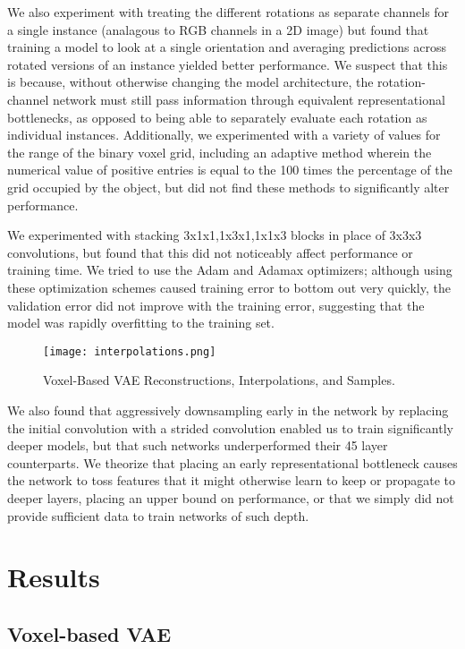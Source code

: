 \documentclass{article}
\begin{document}
We also experiment with treating the different rotations as separate channels for a single instance (analagous to RGB channels in a 2D image) but found that training a model to look at a single orientation and averaging predictions across rotated versions of an instance yielded better performance. We suspect that this is because, without otherwise changing the model architecture, the rotation-channel network must still pass information through equivalent representational bottlenecks, as opposed to being able to separately evaluate each rotation as individual instances. Additionally, we experimented with a variety of values for the range of the binary voxel grid, including an adaptive method wherein the numerical value of positive entries is equal to the 100 times the percentage of the grid occupied by the object, but did not find these methods to significantly alter performance.

We experimented with stacking 3x1x1,1x3x1,1x1x3 blocks in place of 3x3x3 convolutions, but found that this did not noticeably affect performance or training time. We tried to use the Adam and Adamax\citep{Adam} optimizers; although using these optimization schemes caused training error to bottom out very quickly, the validation error did not improve with the training error, suggesting that the model was rapidly overfitting to the training set.
 
\begin{figure}[h]
  	
  \centering
  \texttt{[image: interpolations.png]}
  \caption{Voxel-Based VAE Reconstructions, Interpolations, and Samples.}
  \label{VAERECONfig}
\end{figure}

We also found that aggressively downsampling early in the network by replacing the initial convolution with a strided convolution enabled us to train significantly deeper models, but that such networks underperformed their 45 layer counterparts. We theorize that placing an early representational bottleneck causes the network to toss features that it might otherwise learn to keep or propagate to deeper layers, placing an upper bound on performance, or that we simply did not provide sufficient data to train networks of such depth.


\section{Results}
\label{RESULTS}

\subsection{Voxel-based VAE}
\end{document}
